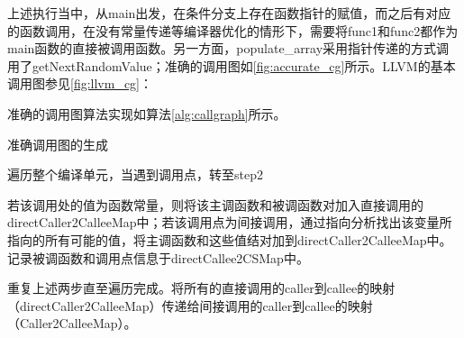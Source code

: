 上述执行当中，从main出发，在条件分支上存在函数指针的赋值，而之后有对应的函数调用，在没有常量传递等编译器优化的情形下，需要将func1和func2都作为main函数的直接被调用函数。另一方面，populate\_array采用指针传递的方式调用了getNextRandomValue；准确的调用图如\autoref{fig:accurate_cg}所示。LLVM的基本调用图参见\autoref{fig:llvm_cg}：

准确的调用图算法实现如算法\ref{alg:callgraph}所示。
\begin{algorithm}\label{alg:callgraph}
\caption{准确调用图的生成}
\SetAlgoNoLine
遍历整个编译单元，当遇到调用点，转至step2

若该调用处的值为函数常量，则将该主调函数和被调函数对加入直接调用的directCaller2CalleeMap中；若该调用点为间接调用，通过指向分析找出该变量所指向的所有可能的值，将主调函数和这些值结对加到directCaller2CalleeMap中。记录被调函数和调用点信息于directCallee2CSMap中。

重复上述两步直至遍历完成。将所有的直接调用的caller到callee的映射（directCaller2CalleeMap）传递给间接调用的caller到callee的映射（Caller2CalleeMap）。
\end{algorithm}

\begin{figure}[!t]
\centering
{}
\hspace{1in}
\end{figure}

